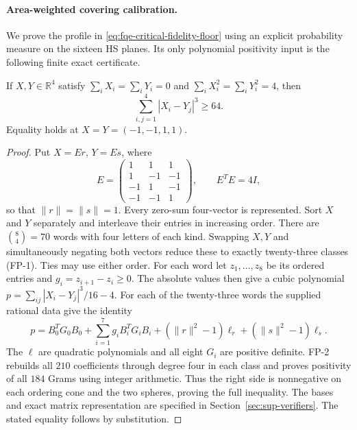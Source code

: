 \paragraph{Area-weighted covering calibration.}
We prove the profile in \eqref{eq:fqe-critical-fidelity-floor} using an
explicit probability measure on the sixteen HS planes. Its only
polynomial positivity input is the following finite exact certificate.

\begin{lemma}
\label{lem:fqe-four-point-cubic}
If $X,Y\in\mathbb R^4$ satisfy
$\sum_iX_i=\sum_iY_i=0$ and $\sum_iX_i^2=\sum_iY_i^2=4$, then
\begin{equation}\label{eq:fqe-four-point-cubic}
 \sum_{i,j=1}^4|X_i-Y_j|^3\ge64.
\end{equation}
Equality holds at $X=Y=(-1,-1,1,1)$.
\end{lemma}

\begin{proof}
Put $X=Er$, $Y=Es$, where
\[
 E=\begin{pmatrix}1&1&1\\1&-1&-1\\-1&1&-1\\-1&-1&1\end{pmatrix},
 \qquad E^TE=4I,
\]
so that $\|r\|=\|s\|=1$. Every zero-sum four-vector is represented.
Sort $X$ and $Y$ separately and interleave their entries in increasing
order. There are $\binom84=70$ words with four letters of each kind.
Swapping $X,Y$ and simultaneously negating both vectors reduce these
to exactly twenty-three classes (FP-1). Ties may use either order.
For each word let $z_1,\ldots,z_8$ be its ordered entries and
$g_i=z_{i+1}-z_i\ge0$. The absolute values then give a cubic polynomial
$p=\sum_{ij}|X_i-Y_j|^3/16-4$.
For each of the twenty-three words the supplied rational data give
the identity
\begin{equation}\label{eq:fqe-four-point-cubic-sos}
 p=B_0^TG_0B_0+\sum_{i=1}^7g_i B_i^TG_iB_i
       +(\|r\|^2-1)\ell_r+(\|s\|^2-1)\ell_s.
\end{equation}
The $\ell$ are quadratic polynomials and all eight $G_i$ are positive
definite. FP-2 rebuilds all $210$ coefficients through degree four
in each class and proves positivity of all $184$ Grams using integer
arithmetic. Thus the right side is nonnegative on each ordering cone
and the two spheres, proving the full inequality. The bases and exact
matrix representation are specified in Section~\ref{sec:sup-verifiers}.
The stated equality follows by substitution.
\end{proof}

